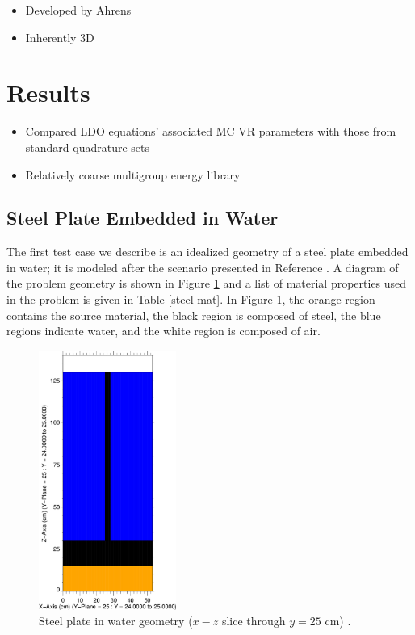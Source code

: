 \documentclass{article} %
\begin{document}
\begin{itemize}
\item{Developed by Ahrens}
\item{Inherently 3D}
\end{itemize}

\section{Results}
\label{sec:results}

\begin{itemize}
\item{Compared LDO equations' associated MC VR parameters with those from
      standard quadrature sets}
\item{Relatively coarse multigroup energy library}
\end{itemize}

\subsection{Steel Plate Embedded in Water}

The first test case we describe is an idealized geometry of a steel plate 
embedded in water; it is modeled after the scenario presented in Reference 
\cite{wilsonslaybaugh}. 
A diagram of the problem geometry is shown in Figure \ref{steelxz} and a list
of material properties used in the problem is given in Table \ref{steel-mat}.
In Figure \ref{steelxz}, the orange region contains the source material, the 
black region is composed of steel, the blue regions indicate water, and the 
white region is composed of air.

\begin{figure}[!htb]
\centering
\includegraphics[width=0.4\textwidth]{img/steel-xz.png}
\caption{Steel plate in water geometry ($x-z$ slice through $y = 25$ cm) 
         \cite{wilsonslaybaugh}.}
\label{steelxz}
\end{figure}
\end{document}
